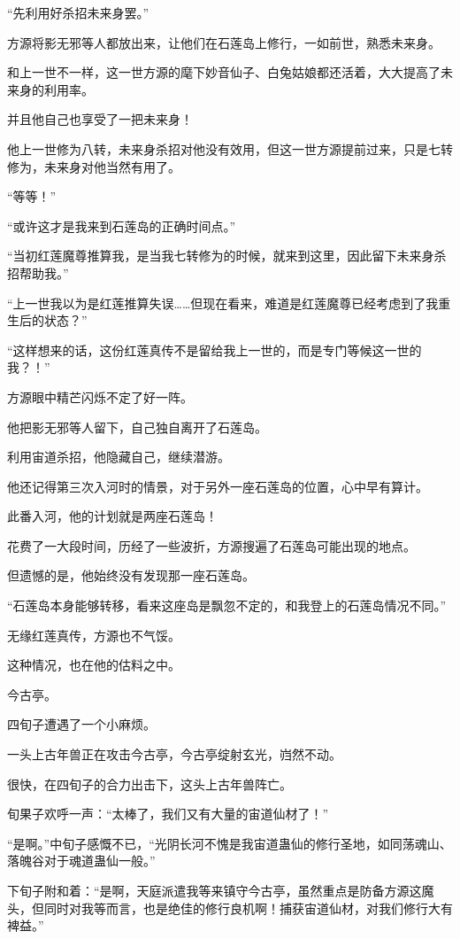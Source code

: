 \begin{this_body}
“先利用好杀招未来身罢。”

方源将影无邪等人都放出来，让他们在石莲岛上修行，一如前世，熟悉未来身。

和上一世不一样，这一世方源的麾下妙音仙子、白兔姑娘都还活着，大大提高了未来身的利用率。

并且他自己也享受了一把未来身！

他上一世修为八转，未来身杀招对他没有效用，但这一世方源提前过来，只是七转修为，未来身对他当然有用了。

“等等！”

“或许这才是我来到石莲岛的正确时间点。”

“当初红莲魔尊推算我，是当我七转修为的时候，就来到这里，因此留下未来身杀招帮助我。”

“上一世我以为是红莲推算失误……但现在看来，难道是红莲魔尊已经考虑到了我重生后的状态？”

“这样想来的话，这份红莲真传不是留给我上一世的，而是专门等候这一世的我？！”

方源眼中精芒闪烁不定了好一阵。

他把影无邪等人留下，自己独自离开了石莲岛。

利用宙道杀招，他隐藏自己，继续潜游。

他还记得第三次入河时的情景，对于另外一座石莲岛的位置，心中早有算计。

此番入河，他的计划就是两座石莲岛！

花费了一大段时间，历经了一些波折，方源搜遍了石莲岛可能出现的地点。

但遗憾的是，他始终没有发现那一座石莲岛。

“石莲岛本身能够转移，看来这座岛是飘忽不定的，和我登上的石莲岛情况不同。”

无缘红莲真传，方源也不气馁。

这种情况，也在他的估料之中。

今古亭。

四旬子遭遇了一个小麻烦。

一头上古年兽正在攻击今古亭，今古亭绽射玄光，岿然不动。

很快，在四旬子的合力出击下，这头上古年兽阵亡。

旬果子欢呼一声：“太棒了，我们又有大量的宙道仙材了！”

“是啊。”中旬子感慨不已，“光阴长河不愧是我宙道蛊仙的修行圣地，如同荡魂山、落魄谷对于魂道蛊仙一般。”

下旬子附和着：“是啊，天庭派遣我等来镇守今古亭，虽然重点是防备方源这魔头，但同时对我等而言，也是绝佳的修行良机啊！捕获宙道仙材，对我们修行大有裨益。”


\end{this_body}
